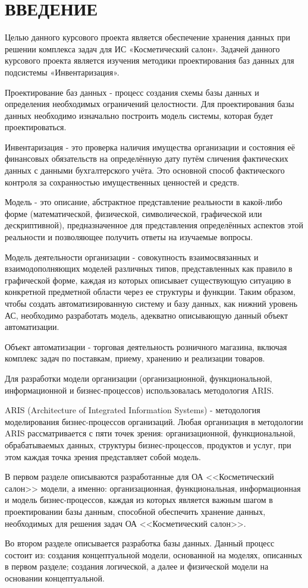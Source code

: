 {}
\section*{ВВЕДЕНИЕ}

Целью данного курсового проекта является обеспечение хранения данных при решении комплекса задач
для ИС «Косметический салон».
Задачей данного курсового проекта является изучения методики проектирования баз данных
для подсистемы «Инвентаризация».

Проектирование баз данных - процесс создания схемы базы данных
и определения необходимых ограничений целостности.
Для проектирования базы данных необходимо изначально построить модель системы,
которая будет проектироваться.

Инвентаризация - это проверка наличия имущества организации и состояния
её финансовых обязательств на определённую дату путём сличения фактических данных
с данными бухгалтерского учёта.
Это основной способ фактического контроля за сохранностью имущественных ценностей и средств.

Модель - это описание, абстрактное представление реальности в какой-либо форме
(математической, физической, символической, графической или дескриптивной),
предназначенное для представления определённых аспектов этой реальности
и позволяющее получить ответы на изучаемые вопросы.

Модель деятельности организации - совокупность взаимосвязанных и взаимодополняющих моделей различных типов,
представленных как правило в графической форме,
каждая из которых описывает существующую ситуацию в конкретной предметной области через ее структуры и функции.
Таким образом, чтобы создать автоматизированную систему и базу данных, как нижний уровень АС,
необходимо разработать модель, адекватно описывающую данный объект автоматизации.

Объект автоматизации - торговая деятельность розничного магазина, включая комплекс задач по поставкам,
приему, хранению и реализации товаров.

Для разработки модели организации (организационной, функциональной, информационной и бизнес-процессов)
использовалась методология ARIS.

ARIS (Architecture of Integrated Information Systems) - методология моделирования бизнес-процессов организаций.
Любая организация в методологии ARIS рассматривается с пяти точек зрения:
организационной, функциональной, обрабатываемых данных, структуры бизнес-процессов,
продуктов и услуг, при этом каждая точка зрения представляет собой модель.

В первом разделе описываются разработанные для ОА <<Косметический салон>> модели,
а именно: организационная, функциональная, информационная и модель бизнес-процессов,
каждая из которых является важным шагом в проектировании базы данным,
способной обеспечить хранение данных, необходимых для решения задач ОА <<Косметический салон>>.

Во втором разделе описывается разработка базы данных.
Данный процесс состоит из: создания концептуальной модели, основанной на моделях, описанных в первом разделе;
создания логической, а далее и физической модели на основании концептуальной.

\newpage
